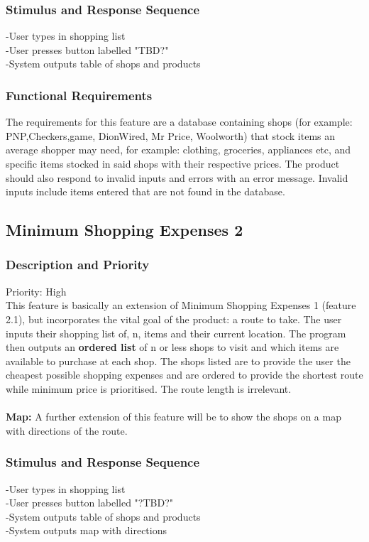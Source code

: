\documentclass[12pt]{article}
\begin{document}
 \subsubsection{Stimulus and Response Sequence}     -User types in shopping list\\
-User presses button labelled "TBD?"\\
-System outputs table of shops and products\\
 \subsubsection{Functional Requirements}
 The requirements for this feature are a database  containing shops (for example: PNP,Checkers,game, DionWired, Mr Price, Woolworth) that stock items an average shopper may need, for example: clothing, groceries, appliances etc, and specific items stocked in said shops with their respective prices. The product should also respond to invalid inputs and errors with an error message. Invalid inputs include items entered that are not found in the database.
 
 \subsection{Minimum Shopping Expenses 2}
\subsubsection{Description and Priority}
 Priority: High\\
 This feature is basically an extension of Minimum Shopping Expenses 1 (feature 2.1), but incorporates the vital goal of the product: a route to take. The user inputs their shopping list of, n, items and their current location. The program then outputs an \textbf{ordered list} of n or less shops to visit and which items are available to purchase at each shop. The shops listed are to provide the user the cheapest possible shopping expenses and are ordered to provide the shortest route while minimum price is prioritised. The route length is irrelevant. 
\\\\
\textbf{Map:} A further extension of this feature will be to show the shops on a map with directions of the route.
 \subsubsection{Stimulus and Response Sequence}
-User types in shopping list\\
-User presses button labelled "?TBD?"\\
-System outputs table of shops and products\\
-System outputs map with directions\\
\end{document}
